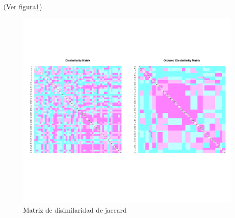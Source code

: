 \documentclass[11pt,]{article}
\begin{document}
(Ver figura\ref{fig:diss_jaccard})

\begin{figure}
\centering
\includegraphics{diss_jaccard.png}
\caption{\label{fig:diss_jaccard}Matriz de disimilaridad de jaccard}
\end{figure}
\end{document}

